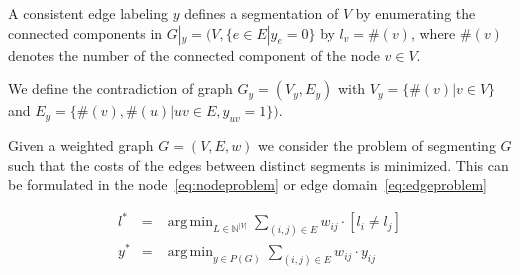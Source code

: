 \documentclass[10pt,twocolumn,letterpaper]{article}
\DeclareMathOperator*{\argmin}{arg\,min}
\begin{document}
A consistent edge labeling $y$ defines a segmentation of $V$ by enumerating the connected components 
in $G|_y=(V,\{e\in E|y_e=0\}$ by $l_v = \#(v)$, where $\#(v)$ denotes the number of the connected component of the node $v\in V$.

We define the contradiction of graph $G_y=(V_y,E_y)$
with $V_y=\{\#(v)|v\in V\}$ and $E_y=\{\#(v),\#(u)|uv\in E, y_{uv}=1\})$.





Given a weighted graph $G=(V,E,w)$ we consider the problem of segmenting $G$ such that the costs
of the edges between distinct segments is minimized. This can be formulated in the node~\ref{eq:nodeproblem} 
or edge domain~\ref{eq:edgeproblem} 

\begin{eqnarray}
  l^* &=& \argmin_{L \in \mathbb{N}^{|V|}} \sum_{ (i,j) \in E } w_{ij} \cdot [l_{i} \neq l_{j}] \label{eq:nodeproblem}\\
  y^* &=& \argmin_{y \in P(G)} \sum_{ (i,j) \in E } w_{ij} \cdot y_{ij} \label{eq:edgeproblem}%
\end{eqnarray}


\end{document}
